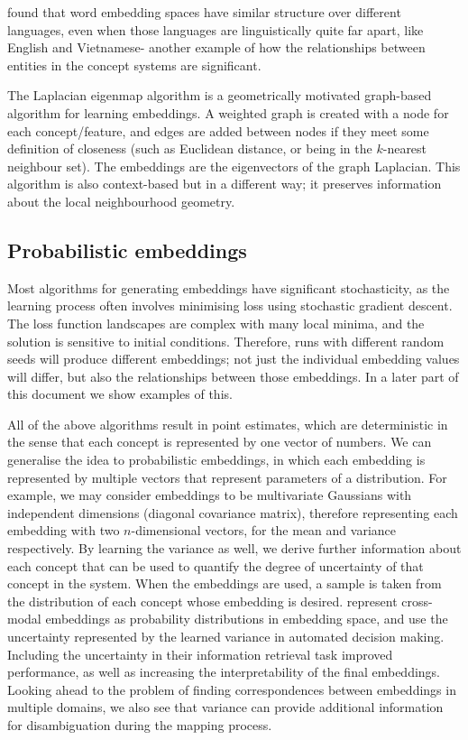 \cite{MikolovMachineTranslation} found that word embedding spaces have similar structure over different languages, even when those languages are linguistically quite far apart, like English and Vietnamese- another example of how the relationships between entities in the concept systems are significant. 

The Laplacian eigenmap algorithm \cite{LaplacianEigenmaps} is a geometrically motivated graph-based algorithm for learning embeddings. A weighted graph is created with a node for each concept/feature, and edges are added between nodes if they meet some definition of closeness (such as Euclidean distance, or being in the $k$-nearest neighbour set). The embeddings are the eigenvectors of the graph Laplacian. This algorithm is also context-based but in a different way; it preserves information about the local neighbourhood geometry. 

\subsection{Probabilistic embeddings}
Most algorithms for generating embeddings have significant stochasticity, as the learning process often involves minimising loss using stochastic gradient descent. The loss function landscapes are complex with many local minima, and the solution is sensitive to initial conditions. Therefore, runs with different random seeds will produce different embeddings; not just the individual embedding values will differ, but also the relationships between those embeddings. In a later part of this document we show examples of this. 

All of the above algorithms result in point estimates, which are deterministic in the sense that each concept is represented by one vector of numbers. We can generalise the idea to probabilistic embeddings, in which each embedding is represented by multiple vectors that represent parameters of a distribution. For example, we may consider embeddings to be multivariate Gaussians with independent dimensions (diagonal covariance matrix), therefore representing each embedding with two $n$-dimensional vectors, for the mean and variance respectively. By learning the variance as well, we derive further information about each concept that can be used to quantify the degree of uncertainty of that concept in the system. When the embeddings are used, a sample is taken from the distribution of each concept whose embedding is desired. \cite{ProbabilisticEmbeddingsCrossModal} represent cross-modal embeddings as probability distributions in embedding space, and use the uncertainty represented by the learned variance in automated decision making. Including the uncertainty in their information retrieval task improved performance, as well as increasing the interpretability of the final embeddings. Looking ahead to the problem of finding correspondences between embeddings in multiple domains, we also see that variance can provide additional information for disambiguation during the mapping process. 


